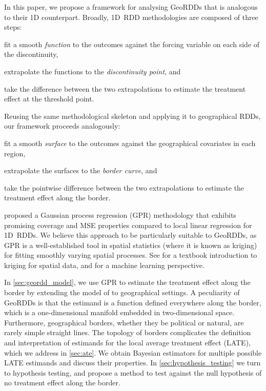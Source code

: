 \documentclass[12pt]{article}
\begin{document}
In this paper, we propose a framework for analysing GeoRDDs that is analogous to their 1D counterpart.
Broadly, 1D~RDD methodologies are composed of three steps:
\begin{flatlist}
    \item
        fit a smooth \emph{function} to the outcomes against the forcing variable on each side of the discontinuity,
    \item
        extrapolate the functions to the \emph{discontinuity point}, and
    \item
        take the difference between the two extrapolations to estimate the treatment effect at the threshold point.
\end{flatlist}
Reusing the same methodological skeleton and applying it to geographical RDDs, our framework proceeds analogously:
\begin{flatlist}
    \item
        fit a smooth \emph{surface} to the outcomes against the geographical covariates in each region,
    \item
        extrapolate the surfaces to the \emph{border curve}, and
    \item
        take the pointwise difference between the two extrapolations to estimate the treatment effect along the border.
\end{flatlist}

\cite{Branson:2017qy} proposed a Gaussian process regression (GPR) methodology that exhibits promising coverage and MSE properties compared to local linear regression for 1D~RDDs.
We believe this approach to be particularly suitable to GeoRDDs, as GPR is a well-established tool in spatial statistics (where it is known as kriging) for fitting smoothly varying spatial processes.
See \cite{banerjee2014hierarchical} for a textbook introduction to kriging for spatial data, and \cite{rasmussen2006gaussian} for a machine learning perspective.

In \autoref{sec:geordd_model}, we use GPR to estimate the treatment effect along the border by extending the model of \cite{Branson:2017qy} to geographical settings.
A peculiarity of GeoRDDs is that the estimand is a function defined everywhere along the border, which is a one-dimensional manifold embedded in two-dimensional space.
Furthermore, geographical borders, whether they be political or natural, are rarely simple straight lines.
The topology of borders complicates the definition and interpretation of estimands for the local average treatment effect (LATE), which we address in \autoref{sec:ate}.
We obtain Bayesian estimators for multiple possible LATE estimands and discuss their properties.
In \autoref{sec:hypothesis_testing} we turn to hypothesis testing, and propose a method to test against the null hypothesis of no treatment effect along the border.
\end{document}
